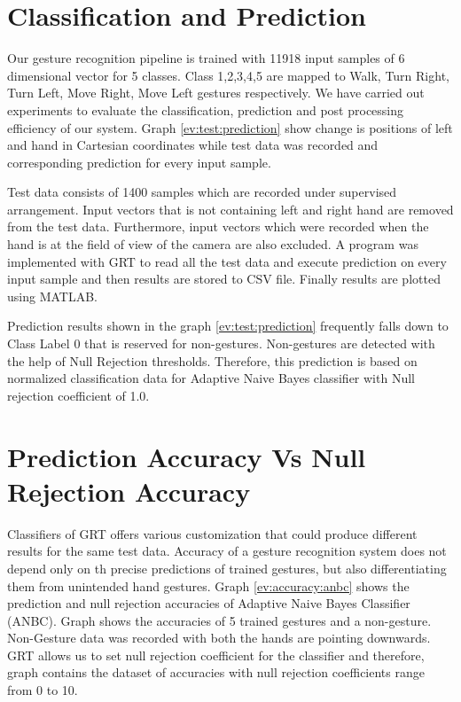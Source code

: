 

\section{Classification and Prediction}
Our gesture recognition pipeline is trained with 11918 input samples of 6 dimensional vector for 5 classes. Class 1,2,3,4,5 are mapped to Walk, Turn Right, Turn Left, Move Right, Move Left gestures respectively. We have carried out experiments to evaluate the classification, prediction and post processing efficiency of our system. Graph \ref{ev:test:prediction} show change is positions of left and hand in Cartesian coordinates while test data was recorded and corresponding prediction for every input sample.

Test data consists of 1400 samples which are recorded under supervised arrangement. Input vectors that is not containing left and right hand are removed from the test data. Furthermore, input vectors which were recorded when the hand is at the field of view of the camera are also excluded. A program was implemented with GRT to read all the test data and execute prediction on every input sample and then results are stored to CSV file. Finally results are plotted using MATLAB.

Prediction results shown in the graph \ref{ev:test:prediction} frequently falls down to Class Label 0 that is reserved for non-gestures. Non-gestures are detected with the help of Null Rejection thresholds. Therefore, this prediction is based on normalized classification data for Adaptive Naive Bayes classifier with Null rejection coefficient of 1.0.



\section{Prediction Accuracy Vs Null Rejection Accuracy} \label{sec:ev:accuracy}
Classifiers of GRT offers various customization that could produce different results for the same test data. Accuracy of a gesture recognition system does not depend only on th precise predictions of trained gestures,  but also differentiating them from unintended hand gestures. Graph \ref{ev:accuracy:anbc} shows the prediction and null rejection accuracies of Adaptive Naive Bayes Classifier (ANBC). Graph shows the accuracies of 5 trained gestures and a non-gesture. Non-Gesture data was recorded with both the hands are pointing downwards. GRT allows us to set null rejection coefficient for the classifier and therefore, graph contains the dataset of accuracies with null rejection coefficients range from 0 to 10.

